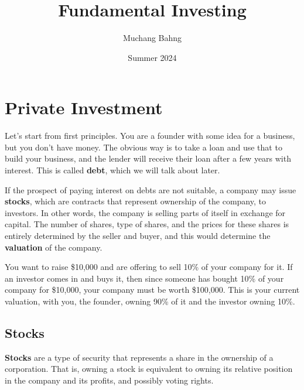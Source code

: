 \documentclass{article}
\begin{document}
\title{Fundamental Investing}
\author{Muchang Bahng}
\date{Summer 2024}

\maketitle
\tableofcontents
\pagebreak

\section{Private Investment}

    Let's start from first principles. You are a founder with some idea for a business, but you don't have money. The obvious way is to take a loan and use that to build your business, and the lender will receive their loan after a few years with interest. This is called \textbf{debt}, which we will talk about later.  

    If the prospect of paying interest on debts are not suitable, a company may issue \textbf{stocks}, which are contracts that represent ownership of the company, to investors. In other words, the company is selling parts of itself in exchange for capital. The number of shares, type of shares, and the prices for these shares is entirely determined by the seller and buyer, and this would determine the \textbf{valuation} of the company. 

    \begin{example}
      You want to raise \$10,000 and are offering to sell 10\% of your company for it. If an investor comes in and buys it, then since someone has bought 10\% of your company for \$10,000, your company must be worth \$100,000. This is your current valuation, with you, the founder, owning 90\% of it and the investor owning 10\%. 
    \end{example}

  \subsection{Stocks}

    \begin{definition}[Stocks]
      \textbf{Stocks} are a type of security that represents a share in the ownership of a corporation. That is, owning a stock is equivalent to owning its relative position in the company and its profits, and possibly voting rights. 
    \end{definition}
\end{document}
